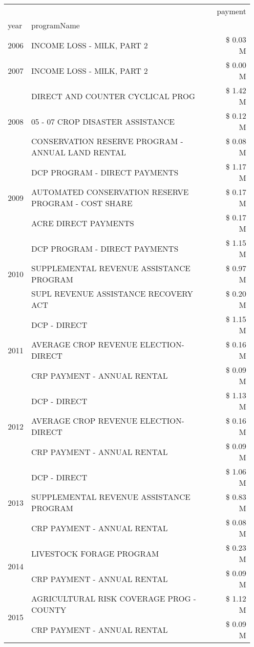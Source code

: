 \begin{tabular}{llr}
\toprule
 &  & payment \\
year & programName &  \\
\midrule
2006 & INCOME LOSS - MILK, PART 2 & \$ 0.03 M \\
\cline{1-3}
2007 & INCOME LOSS - MILK, PART 2 & \$ 0.00 M \\
\cline{1-3}
\multirow[t]{3}{*}{2008} & DIRECT AND COUNTER CYCLICAL PROG & \$ 1.42 M \\
 & 05 - 07 CROP DISASTER ASSISTANCE & \$ 0.12 M \\
 & CONSERVATION RESERVE PROGRAM - ANNUAL LAND RENTAL & \$ 0.08 M \\
\cline{1-3}
\multirow[t]{3}{*}{2009} & DCP PROGRAM - DIRECT PAYMENTS & \$ 1.17 M \\
 & AUTOMATED CONSERVATION RESERVE PROGRAM - COST SHARE & \$ 0.17 M \\
 & ACRE DIRECT PAYMENTS & \$ 0.17 M \\
\cline{1-3}
\multirow[t]{3}{*}{2010} & DCP PROGRAM - DIRECT PAYMENTS & \$ 1.15 M \\
 & SUPPLEMENTAL REVENUE ASSISTANCE PROGRAM & \$ 0.97 M \\
 & SUPL REVENUE ASSISTANCE RECOVERY ACT & \$ 0.20 M \\
\cline{1-3}
\multirow[t]{3}{*}{2011} & DCP - DIRECT & \$ 1.15 M \\
 & AVERAGE CROP REVENUE ELECTION-DIRECT & \$ 0.16 M \\
 & CRP PAYMENT - ANNUAL RENTAL & \$ 0.09 M \\
\cline{1-3}
\multirow[t]{3}{*}{2012} & DCP - DIRECT & \$ 1.13 M \\
 & AVERAGE CROP REVENUE ELECTION-DIRECT & \$ 0.16 M \\
 & CRP PAYMENT - ANNUAL RENTAL & \$ 0.09 M \\
\cline{1-3}
\multirow[t]{3}{*}{2013} & DCP - DIRECT & \$ 1.06 M \\
 & SUPPLEMENTAL REVENUE ASSISTANCE PROGRAM & \$ 0.83 M \\
 & CRP PAYMENT - ANNUAL RENTAL & \$ 0.08 M \\
\cline{1-3}
\multirow[t]{2}{*}{2014} & LIVESTOCK FORAGE PROGRAM & \$ 0.23 M \\
 & CRP PAYMENT - ANNUAL RENTAL & \$ 0.09 M \\
\cline{1-3}
\multirow[t]{3}{*}{2015} & AGRICULTURAL RISK COVERAGE PROG - COUNTY & \$ 1.12 M \\
 & CRP PAYMENT - ANNUAL RENTAL & \$ 0.09 M \\

\end{tabular}
